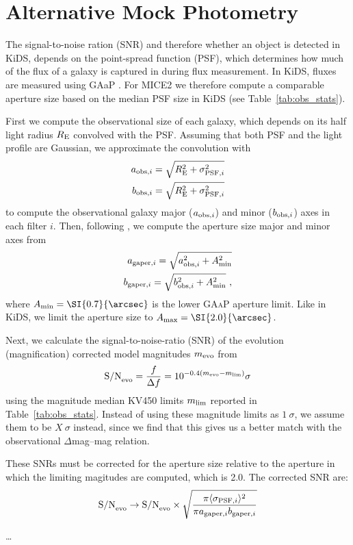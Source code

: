 
\section{Alternative Mock Photometry}

The signal-to-noise ration (SNR) and therefore whether an object is detected in KiDS, depends on the point-spread function (PSF), which determines how much of the flux of a galaxy is captured in during flux measurement. In KiDS, fluxes are measured using GAaP \citet[][probably not the correct reference here]{Kuijken19}. For MICE2 we therefore compute a comparable aperture size based on the median PSF size in KiDS (see Table~\ref{tab:obs_stats}).

First we compute the observational size of each galaxy, which depends on its half light radius $R_{\rm E}$ convolved with the PSF. Assuming that both PSF and the light profile are Gaussian, we approximate the convolution with
\begin{align}
  a_{{\rm obs},i} = \sqrt{R_{\rm E}^2 + \sigma_{{\rm PSF},i}^2} \\
  b_{{\rm obs},i} = \sqrt{R_{\rm E}^2 + \sigma_{{\rm PSF},i}^2}
\end{align}
to compute the observational galaxy major ($a_{{\rm obs},i}$) and minor ($b_{{\rm obs},i}$) axes in each filter $i$. Then, following \citet[][Eq.~8]{Kuijken19}, we compute the aperture size major and minor axes from
\begin{align}
  a_{{\rm gaper},i} = \sqrt{a_{{\rm obs},i}^2 + A_{\rm min}^2} \\
  b_{{\rm gaper},i} = \sqrt{b_{{\rm obs},i}^2 + A_{\rm min}^2} ~,
\end{align}
where $A_{\rm min} = \SI{0.7}{\arcsec}$ is the lower \textsc{GAaP} aperture limit. Like in KiDS, we limit the aperture size to $A_{\rm max} = \SI{2.0}{\arcsec}$.

Next, we calculate the signal-to-noise-ratio (SNR) of the evolution (magnification) corrected model magnitudes $m_{\rm evo}$ from
\begin{equation}
  \text{S/N}_{\rm evo} = \frac{f}{\Delta f} = 10^{-0.4 (m_{\rm evo} - m_{\rm lim})} \sigma
\end{equation}
using the magnitude median KV450 limits $m_{\rm lim}$ reported in Table~\ref{tab:obs_stats}. {\tiny Instead of using these magnitude limits as $1~\sigma$, we assume them to be $X~\sigma$ instead, since we find that this gives us a better match with the observational $\Delta$mag--mag relation.}

These SNRs must be corrected for the aperture size relative to the aperture in which the limiting magitudes are computed, which is \SI{2.0}{\arcsec}. The corrected SNR are:
\begin{equation}
  {\rm S/N}_{\rm evo} \rightarrow {\rm S/N}_{\rm evo} \times \sqrt{\frac{\pi \langle \sigma_{{\rm PSF},i} \rangle^2}{\pi a_{{\rm gaper},i} b_{{\rm gaper},i}}}
\end{equation}

\dots

